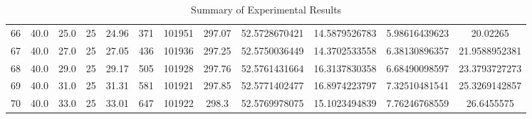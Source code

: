 \begin{table}[H]
\begin{center}
\begin{tabular}{|cccccccccccc|}
	66 & 40.0 & 25.0 & 25 & 24.96 & 371 & 101951 & 297.07 & 52.5728670421 & 14.5879526783 & 5.98616439623 & 20.02265\\
	67 & 40.0 & 27.0 & 25 & 27.05 & 436 & 101936 & 297.25 & 52.5750036449 & 14.3702533558 & 6.38130896357 & 21.9588952381\\
	68 & 40.0 & 29.0 & 25 & 29.17 & 505 & 101928 & 297.76 & 52.5761431664 & 16.3137830358 & 6.68490098597 & 23.3793727273\\
	69 & 40.0 & 31.0 & 25 & 31.31 & 581 & 101921 & 297.85 & 52.5771402477 & 16.8974223797 & 7.32510481541 & 25.3269142857\\
	70 & 40.0 & 33.0 & 25 & 33.01 & 647 & 101922 & 298.3 & 52.5769978075 & 15.1023494839 & 7.76246768559 & 26.6455575\\
	\hline
\end{tabular}
\caption{Summary of Experimental Results}
\label{table:experiment_results_summary}
\end{center}
\end{table}
\renewcommand\baselinestretch{2}\selectfont
